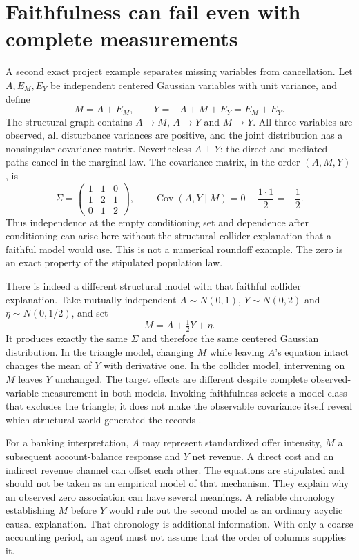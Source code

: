 \section{Faithfulness can fail even with complete measurements}
\label{exec14:l4-faithfulness}

A second exact project example separates missing variables from cancellation.
Let $A,E_M,E_Y$ be independent centered Gaussian variables with unit variance,
and define
\[
 M=A+E_M,\qquad Y=-A+M+E_Y=E_M+E_Y.
\]
The structural graph contains $A\to M$, $A\to Y$ and $M\to Y$. All three
variables are observed, all disturbance variances are positive, and the
joint distribution has a nonsingular covariance matrix. Nevertheless
$A\perp Y$: the direct and mediated paths cancel in the marginal law.
The covariance matrix, in the order $(A,M,Y)$, is
\[
 \Sigma=\begin{pmatrix}1&1&0\\1&2&1\\0&1&2\end{pmatrix},
 \qquad
 \operatorname{Cov}(A,Y\mid M)=0-\frac{1\cdot1}{2}=-\frac12.
\]
Thus independence at the empty conditioning set and dependence after
conditioning can arise here without the structural collider explanation
that a faithful model would use. This is not a numerical roundoff example.
The zero is an exact property of the stipulated population law.

There is indeed a different structural model with that faithful collider
explanation. Take mutually independent $A\sim N(0,1)$, $Y\sim N(0,2)$
and $\eta\sim N(0,1/2)$, and set
\[
 M=A+\tfrac12Y+\eta.
\]
It produces exactly the same $\Sigma$ and therefore the same centered
Gaussian distribution. In the triangle model, changing $M$ while leaving
$A$'s equation intact changes the mean of $Y$ with derivative one. In the
collider model, intervening on $M$ leaves $Y$ unchanged. The target effects
are different despite complete observed-variable measurement in both models.
Invoking faithfulness selects a model class that excludes the triangle; it
does not make the observable covariance itself reveal which structural world
generated the records \citep{exec14_discovery_design_oracles}.

For a banking interpretation, $A$ may represent standardized offer intensity,
$M$ a subsequent account-balance response and $Y$ net revenue. A direct cost
and an indirect revenue channel can offset each other. The equations are
stipulated and should not be taken as an empirical model of that mechanism.
They explain why an observed zero association can have several meanings.
A reliable chronology establishing $M$ before $Y$ would rule out the second
model as an ordinary acyclic causal explanation. That chronology is additional
information. With only a coarse accounting period, an agent must not assume
that the order of columns supplies it.

